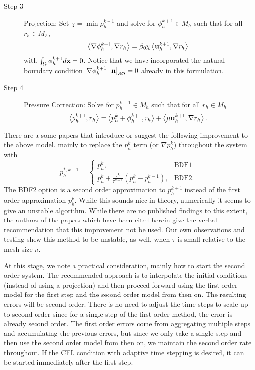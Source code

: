 \documentclass[letterpaper]{erdc}
\begin{document}
\begin{description}
\item[Step 3] Projection: Set $\chi = \min \rho_h^{k+1}$ and solve for $\phi_h^{k+1}\in M_h$ such that for all $r_h\in M_h$,
\begin{equation}
 \left\langle \nabla \phi_h^{k+1}, \nabla r_h \right\rangle = \beta_0 \chi \left\langle \textbf{u}_h^{k+1}, \nabla r_h \right\rangle
\end{equation}
with $\int_{\Omega}\phi_h^{k+1}d\textbf{x} = 0$.  Notice that we have incorporated the natural boundary condition $\left.\nabla\phi_h^{k+1}\cdot\textbf{n}\right|_{\partial\Omega} = 0 $ already in this formulation.  

\item[Step 4] Pressure Correction: Solve for $p_h^{k+1}\in M_h$ such that for all $r_h\in M_h$
\begin{equation}
  \left\langle p_h^{k+1}, r_h \right\rangle = \left\langle p_h^{k} + \phi_h^{k+1}, r_h \right\rangle + \left\langle \mu \textbf{u}_h^{k+1}, \nabla r_h \right\rangle.
\end{equation}
\end{description}


\begin{remark}
There are a some papers that introduce or suggest the following improvement to the above model, mainly to replace the $p^{k}_h$ term (or $\nabla p^{k}_h$) throughout the system with
\begin{equation}
  p_h^{*,k+1} = \begin{cases}
                p_h^{k}, & \mbox{BDF1}\\
                p_h^{k} + \frac{\tau^{k}}{\tau^{k-1}}\left( p_h^k - p_h^{k-1} \right), & \mbox{BDF2}.
                \end{cases}
\end{equation}
The BDF2 option is a second order approximation to $p^{k+1}_h$ instead of the first order approximation $p_h^k$.  While this sounds nice in theory, numerically it seems to give an unstable algorithm.  While there are no published findings to this extent, the authors of the papers which have been cited herein give the verbal recommendation that this improvement not be used.  Our own observations and testing show this method to be unstable, as well, when $\tau$ is small relative to the mesh size $h$.
\end{remark}

\begin{remark}
At this stage, we note a practical consideration, mainly how to start the second order system.  The recommended approach is to interpolate the initial conditions (instead of using a projection) and then proceed forward using the first order model for the first step and the second order model from then on.  The resulting errors will be second order.  There is no need to adjust the time steps to scale up to second order since for a single step of the first order method, the error is already second order.  The first order errors come from aggregating multiple steps and accumulating the previous errors, but since we only take a single step and then use the second order model from then on, we maintain the second order rate throughout.  If the CFL condition with adaptive time stepping is desired, it can be started immediately after the first step.
\end{remark}
\end{document}
